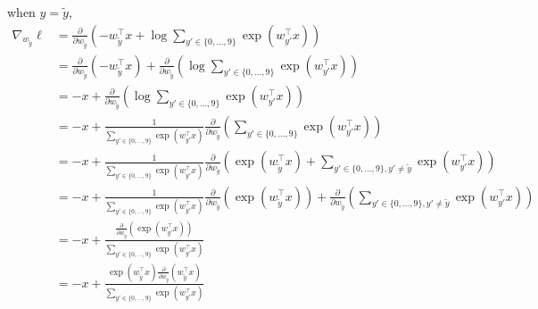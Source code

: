 \documentclass{exam}
\begin{document}
\begin{questions}
\begin{parts}
        when $y = \tilde{y}$,
        \begin{align*}
            \nabla_{w_{\tilde{y}}} \ell & = \frac{\partial}{\partial w_{\tilde{y}}}\left( -w^\top_{\tilde{y}} x + \log \sum_{y' \in \{0, \dots , 9\}} \exp(w^\top_{y'} x)\right)                                                                                                                                         \\
                                        & = \frac{\partial}{\partial w_{\tilde{y}}}\left( -w^\top_{\tilde{y}} x \right) + \frac{\partial}{\partial w_{\tilde{y}}}\left(\log \sum_{y' \in \{0, \dots , 9\}} \exp(w^\top_{y'} x)\right)                                                                                    \\
                                        & = -x + \frac{\partial}{\partial w_{\tilde{y}}}\left(\log \sum_{y' \in \{0, \dots , 9\}} \exp(w^\top_{y'} x)\right)                                                                                                                                                             \\
                                        & = -x + \frac{1}{\sum_{y' \in \{0, \dots , 9\}} \exp(w^\top_{y'} x)} \frac{\partial}{\partial w_{\tilde{y}}}\left(\sum_{y' \in \{0, \dots , 9\}} \exp(w^\top_{y'} x)\right)                                                                                                     \\
                                        & = -x + \frac{1}{\sum_{y' \in \{0, \dots , 9\}} \exp(w^\top_{y'} x)} \frac{\partial}{\partial w_{\tilde{y}}}\left(\exp(w^\top_{\tilde{y}} x) + \sum_{y' \in \{0, \dots , 9\}, y' \neq \tilde{y}} \exp(w^\top_{y'} x)\right)                                                     \\
                                        & = -x + \frac{1}{\sum_{y' \in \{0, \dots , 9\}} \exp(w^\top_{y'} x)} \frac{\partial}{\partial w_{\tilde{y}}}\left(\exp(w^\top_{\tilde{y}} x)\right) + \frac{\partial}{\partial w_{\tilde{y}}}\left(\sum_{y' \in \{0, \dots , 9\}, y' \neq \tilde{y}} \exp(w^\top_{y'} x)\right) \\
                                        & = -x + \frac{\frac{\partial}{\partial w_{\tilde{y}}}\left(\exp(w^\top_{y'} x)\right)}{\sum_{y' \in \{0, \dots , 9\}} \exp(w^\top_{y'} x)}                                                                                                                                      \\
                                        & = -x + \frac{\exp(w^\top_{\tilde{y}} x)\frac{\partial}{\partial w_{\tilde{y}}}\left(w^\top_{\tilde{y}} x\right)}{\sum_{y' \in \{0, \dots , 9\}} \exp(w^\top_{y'} x)}                                                                                                           \\

\end{align*}
\end{parts}
\end{questions}
\end{document}
